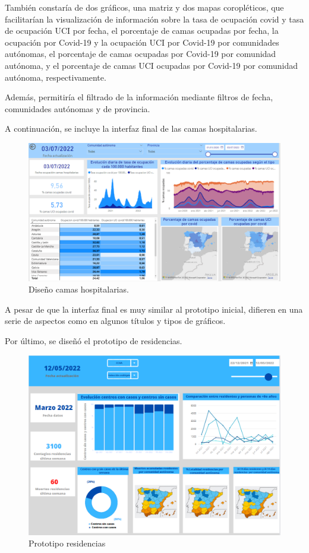 También constaría de dos gráficos, una matriz y dos mapas coropléticos, que facilitarían la visualización de información sobre la tasa de ocupación covid y tasa de ocupación UCI por fecha, el porcentaje de camas ocupadas por fecha, la ocupación por Covid-19 y la ocupación UCI por Covid-19 por comunidades autónomas, el porcentaje de camas ocupadas por Covid-19 por comunidad autónoma, y el porcentaje de camas UCI ocupadas por Covid-19 por comunidad autónoma, respectivamente. 

Además, permitiría el filtrado de la información mediante filtros de fecha, comunidades autónomas y de provincia.

\newpage
A continuación, se incluye la interfaz final de las camas hospitalarias.

\begin{figure}[h]
    \advance\leftskip-0.5cm 
    \includegraphics[scale=0.55]{img/powerBI_camas.PNG}
    \caption{Diseño camas hospitalarias.}
\end{figure}

A pesar de que la interfaz final es muy similar al prototipo inicial, difieren en una serie de aspectos como en algunos títulos y tipos de gráficos.

\newpage
Por último, se diseñó el prototipo de residencias. 

\begin{figure}[h]
    \advance\leftskip-1cm 
    \includegraphics[scale=0.7]{img/prototipo_residencias.PNG}
    \caption{Prototipo residencias}
\end{figure}

